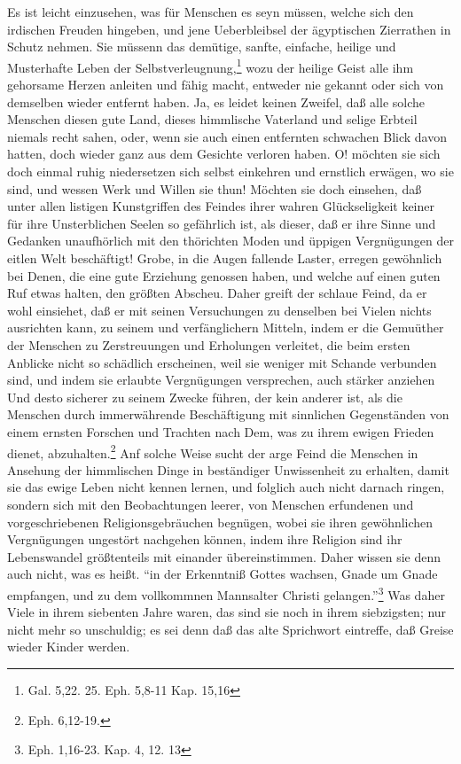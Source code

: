 Es ist leicht einzusehen, was für Menschen es seyn müssen, welche sich den irdischen Freuden hingeben, und jene Ueberbleibsel der ägyptischen Zierrathen in Schutz nehmen. Sie müssenn das demütige, sanfte, einfache, heilige und Musterhafte Leben der Selbstverleugnung,\footnote{Gal. 5,22. 25. Eph. 5,8-11 Kap. 15,16} wozu der heilige Geist alle ihm gehorsame Herzen anleiten und fähig macht, entweder nie gekannt oder sich von demselben wieder entfernt haben. Ja, es leidet keinen Zweifel, daß alle solche Menschen diesen gute Land, dieses himmlische Vaterland und selige Erbteil niemals recht sahen, oder, wenn sie auch einen entfernten schwachen Blick davon hatten, doch wieder ganz aus dem Gesichte verloren haben. O! möchten sie sich doch einmal ruhig niedersetzen sich selbst einkehren und ernstlich erwägen, wo sie sind, und wessen Werk und Willen sie thun! Möchten sie doch einsehen, daß unter allen listigen Kunstgriffen des Feindes ihrer wahren Glückseligkeit keiner für ihre Unsterblichen Seelen so gefährlich ist, als dieser, daß er ihre Sinne und Gedanken unaufhörlich mit den thörichten Moden und üppigen Vergnügungen der eitlen Welt beschäftigt! Grobe, in die Augen fallende Laster, erregen gewöhnlich bei Denen, die eine gute Erziehung genossen haben, und welche auf einen guten Ruf etwas halten, den größten Abscheu. Daher greift der schlaue Feind, da er wohl einsiehet, daß er mit seinen Versuchungen zu denselben bei Vielen nichts ausrichten kann, zu seinem und verfänglichern Mitteln, indem er die Gemuüther der Menschen zu Zerstreuungen und Erholungen verleitet, die beim ersten Anblicke nicht so schädlich erscheinen, weil sie weniger mit Schande verbunden sind, und indem sie erlaubte Vergnügungen versprechen, auch stärker anziehen Und desto sicherer zu seinem Zwecke führen, der kein anderer ist, als die Menschen durch immerwährende Beschäftigung mit sinnlichen Gegenständen von einem ernsten Forschen und Trachten nach Dem, was zu ihrem ewigen Frieden dienet, abzuhalten.\footnote{Eph. 6,12-19.} Anf solche Weise sucht der arge Feind die Menschen in Ansehung der himmlischen Dinge in beständiger Unwissenheit zu erhalten, damit sie das ewige Leben nicht kennen lernen, und folglich auch nicht darnach ringen, sondern sich mit den Beobachtungen leerer, von Menschen erfundenen und vorgeschriebenen Religionsgebräuchen begnügen, wobei sie ihren gewöhnlichen Vergnügungen ungestört nachgehen können, indem ihre Religion sind ihr Lebenswandel größtenteils mit einander übereinstimmen. Daher wissen sie denn auch nicht, was es heißt. "`in der Erkenntniß Gottes wachsen, Gnade um Gnade empfangen, und zu dem vollkommnen Mannsalter Christi gelangen."'\footnote{Eph. 1,16-23. Kap. 4, 12. 13} Was daher Viele in ihrem siebenten Jahre waren, das sind sie noch in ihrem siebzigsten; nur nicht mehr so unschuldig; es sei denn daß das alte Sprichwort eintreffe, daß Greise wieder Kinder werden.

